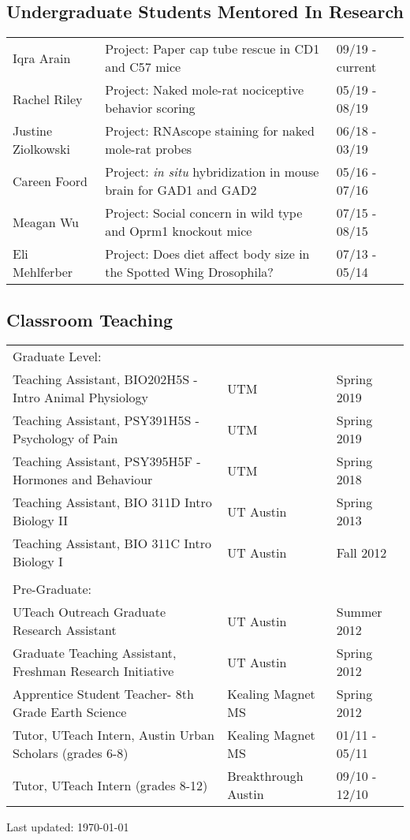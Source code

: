 \documentclass[letterpaper]{article}
\begin{document}
\subsection*{Undergraduate Students Mentored In Research}
\begin{tabular}{lll}
Iqra Arain			&Project: Paper cap tube rescue in CD1 and C57 mice				&09/19 - current\\
Rachel Riley 		&Project: Naked mole-rat nociceptive behavior scoring				&05/19 - 08/19\\
Justine Ziolkowski	&Project: RNAscope staining for naked mole-rat probes				&06/18 - 03/19\\
Careen Foord		&Project: \textit{in situ} hybridization in mouse brain for GAD1 and GAD2 &05/16 - 07/16 \\
Meagan Wu		&Project: Social concern in wild type and Oprm1 knockout mice		&07/15 - 08/15 \\
Eli Mehlferber		&Project: Does diet affect body size in the Spotted Wing Drosophila?	&07/13 - 05/14 \\
\end{tabular}

\subsection*{Classroom Teaching}
\begin{tabular}{lll}
Graduate Level: \\
Teaching Assistant, BIO202H5S - Intro Animal Physiology  	& UTM     				& Spring 2019 \\
Teaching Assistant, PSY391H5S - Psychology of Pain  		& UTM         			& Spring 2019 \\
Teaching Assistant, PSY395H5F - Hormones and Behaviour	& UTM      			& Spring 2018 \\
Teaching Assistant, BIO 311D Intro Biology II				& UT Austin			& Spring 2013 \\
Teaching Assistant, BIO 311C Intro Biology I				& UT Austin			& Fall 2012 \\
\\
Pre-Graduate: \\
UTeach Outreach Graduate Research Assistant			& UT Austin 			& Summer 2012 \\
Graduate Teaching Assistant, Freshman Research Initiative	& UT Austin 			& Spring 2012 \\
Apprentice Student Teacher- 8th Grade Earth Science		& Kealing Magnet MS	& Spring 2012 \\
Tutor, UTeach Intern, Austin Urban Scholars (grades 6-8)		& Kealing Magnet MS 	& 01/11 - 05/11 \\
Tutor, UTeach Intern (grades 8-12)						& Breakthrough Austin	& 09/10 - 12/10 \\
\end{tabular}



\bigskip

\begin{center}
  \begin{footnotesize}
    Last updated: \today \\
  \end{footnotesize}
\end{center}
\end{document}
